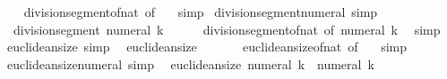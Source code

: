 \begin{isabellebody}
%
\isadelimproof
\ \ %
\endisadelimproof
%
\isatagproof
{}\isamarkupfalse%
\ division{\isacharunderscore}{\kern0pt}segment{\isacharunderscore}{\kern0pt}of{\isacharunderscore}{\kern0pt}nat\ {\isacharbrackleft}{\kern0pt}of\ {}{\isacharbrackright}{\kern0pt}\ \isamarkupfalse%
\ simp%
\endisatagproof
{\isafoldproof}%
%
\isadelimproof
\isanewline
%
\endisadelimproof
\isanewline
{}\isamarkupfalse%
\ division{\isacharunderscore}{\kern0pt}segment{\isacharunderscore}{\kern0pt}numeral\ {\isacharbrackleft}{\kern0pt}simp{\isacharbrackright}{\kern0pt}{\isacharcolon}{\kern0pt}\isanewline
\ \ {\isachardoublequoteopen}division{\isacharunderscore}{\kern0pt}segment\ {\isacharparenleft}{\kern0pt}numeral\ k{\isacharparenright}{\kern0pt}\ {\isacharequal}{\kern0pt}\ {}{\isachardoublequoteclose}\isanewline
%
\isadelimproof
\ \ %
\endisadelimproof
%
\isatagproof
{}\isamarkupfalse%
\ division{\isacharunderscore}{\kern0pt}segment{\isacharunderscore}{\kern0pt}of{\isacharunderscore}{\kern0pt}nat\ {\isacharbrackleft}{\kern0pt}of\ {\isachardoublequoteopen}numeral\ k{\isachardoublequoteclose}{\isacharbrackright}{\kern0pt}\ \isamarkupfalse%
\ simp%
\endisatagproof
{\isafoldproof}%
%
\isadelimproof
\isanewline
%
\endisadelimproof
\isanewline
{}\isamarkupfalse%
\ euclidean{\isacharunderscore}{\kern0pt}size{\isacharunderscore}{\kern0pt}{}\ {\isacharbrackleft}{\kern0pt}simp{\isacharbrackright}{\kern0pt}{\isacharcolon}{\kern0pt}\isanewline
\ \ {\isachardoublequoteopen}euclidean{\isacharunderscore}{\kern0pt}size\ {}\ {\isacharequal}{\kern0pt}\ {}{\isachardoublequoteclose}\isanewline
%
\isadelimproof
\ \ %
\endisadelimproof
%
\isatagproof
{}\isamarkupfalse%
\ euclidean{\isacharunderscore}{\kern0pt}size{\isacharunderscore}{\kern0pt}of{\isacharunderscore}{\kern0pt}nat\ {\isacharbrackleft}{\kern0pt}of\ {}{\isacharbrackright}{\kern0pt}\ \isamarkupfalse%
\ simp%
\endisatagproof
{\isafoldproof}%
%
\isadelimproof
\isanewline
%
\endisadelimproof
\isanewline
{}\isamarkupfalse%
\ euclidean{\isacharunderscore}{\kern0pt}size{\isacharunderscore}{\kern0pt}numeral\ {\isacharbrackleft}{\kern0pt}simp{\isacharbrackright}{\kern0pt}{\isacharcolon}{\kern0pt}\isanewline
\ \ {\isachardoublequoteopen}euclidean{\isacharunderscore}{\kern0pt}size\ {\isacharparenleft}{\kern0pt}numeral\ k{\isacharparenright}{\kern0pt}\ {\isacharequal}{\kern0pt}\ numeral\ k{\isachardoublequoteclose}\isanewline
%
\isadelimproof
\ \ %

\end{isabellebody}
